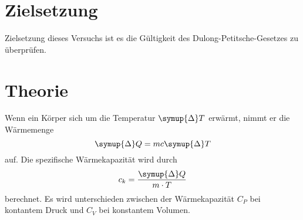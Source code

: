 \section{Zielsetzung}
Zielsetzung dieses Versuchs ist es die Gültigkeit des Dulong-Petitsche-Gesetzes zu überprüfen.
\section{Theorie}
\label{sec:Theorie}
Wenn ein Körper sich um die Temperatur $\symup{\Delta} T$ erwärmt, nimmt er die Wärmemenge
\begin{equation}
\symup{\Delta} Q = m c \symup{\Delta} T
\end{equation}
auf.
Die spezifische Wärmekapazität wird durch
\begin{equation}
c_k = \frac{\symup{\Delta} Q}{m \cdot T}
\end{equation}
berechnet.
Es wird unterschieden zwischen der Wärmekapazität $C_P$ bei kontantem Druck und $C_V$ bei konstantem Volumen.
